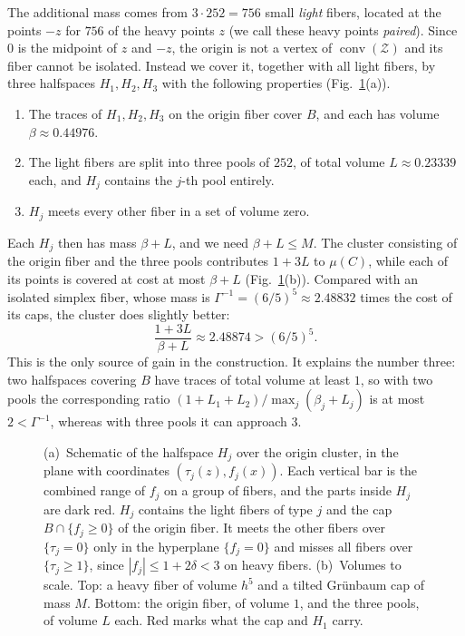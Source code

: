 \documentclass[11pt]{article}
\makeatletter
\renewcommand\paragraph{\@startsection{paragraph}{4}{\z@}{1.6ex \@plus .5ex \@minus .2ex}{-1em}{\normalfont\normalsize\bfseries}}
\newcommand{\Zcal}{\mathcal{Z}}
\newcommand{\1}{\mathbf{1}}
\DeclareMathOperator{\conv}{conv}
\makeatother
\begin{document}
\paragraph{The origin cluster.}
The additional mass comes from $3\cdot252=756$ small \emph{light} fibers, located at the points $-z$ for $756$ of the heavy
points $z$ (we call these heavy points \emph{paired}). Since $0$ is the midpoint of $z$ and $-z$, the origin is not a vertex
of $\conv(\Zcal)$ and its fiber cannot be isolated. Instead we cover it, together with all light fibers, by three halfspaces
$H_1,H_2,H_3$ with the following properties (Fig.~\ref{fig:mechanism}(a)).
\begin{enumerate}[label=(\roman*)]
\item The traces of $H_1,H_2,H_3$ on the origin fiber cover $B$, and each has volume $\beta\approx0.44976$.
\item The light fibers are split into three pools of $252$, of total volume $L\approx0.23339$ each, and $H_j$ contains the
$j$-th pool entirely.
\item $H_j$ meets every other fiber in a set of volume zero.
\end{enumerate}
Each $H_j$ then has mass $\beta+L$, and we need $\beta+L\le M$. The cluster consisting of the origin fiber and the three pools
contributes $1+3L$ to $\mu(C)$, while each of its points is covered at cost at most $\beta+L$
(Fig.~\ref{fig:mechanism}(b)). Compared with an isolated simplex fiber, whose mass is $\Gamma^{-1}=(6/5)^5\approx2.48832$
times the cost of its caps, the cluster does slightly better:
\[
\frac{1+3L}{\beta+L}\approx2.48874>(6/5)^5.
\]
This is the only source of gain in the construction. It explains the number three: two halfspaces covering $B$ have traces
of total volume at least $1$, so with two pools the corresponding ratio ${(1+L_1+L_2)/\max_j(\beta_j+L_j)}$ is at most
$2<\Gamma^{-1}$, whereas with three pools it can approach $3$.

\begin{figure}[t]
\centering

\caption{(a)~Schematic of the halfspace $H_j$ over the origin cluster, in the plane with coordinates $(\tau_j(z),f_j(x))$.
Each vertical bar is the combined range of $f_j$ on a group of fibers, and the parts inside $H_j$ are dark red. $H_j$
contains the light fibers of type $j$ and the cap $B\cap\{f_j\ge0\}$ of the origin fiber. It meets the other fibers over
$\{\tau_j=0\}$ only in the hyperplane $\{f_j=0\}$ and misses all fibers over $\{\tau_j\ge1\}$, since $|f_j|\le1+2\delta<3$
on heavy fibers. (b)~Volumes to scale. Top: a heavy fiber of volume $h^5$ and a tilted Gr\"unbaum cap of mass $M$. Bottom:
the origin fiber, of volume $1$, and the three pools, of volume $L$ each. Red marks what the cap and $H_1$ carry.}
\label{fig:mechanism}
\end{figure}
\end{document}
